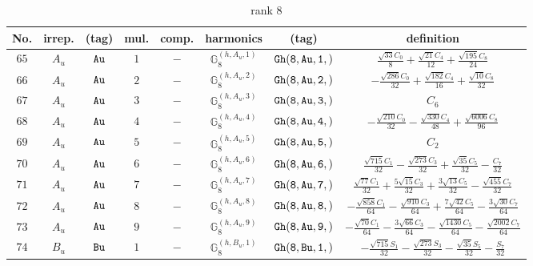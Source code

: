 \documentclass[fleqn,8pt]{jsarticle}
\begin{document}
\begin{table}[ht!]
\begin{center}
\caption{rank 8}
\renewcommand{\arraystretch}{1.3}
\begin{tabular}{cccccccc} \hline \hline
No. & irrep. & (tag) & mul. & comp. & harmonics & (tag) & definition \\ \hline
$ 65 $ & $ A_{u} $ & $ {\tt Au} $ & $ 1 $ & $ - $ & $ \mathbb{G}_{8}^{(h,A_{u},1)} $ & $ {\tt Gh(8,Au,1,)} $ & $ \frac{\sqrt{33} C_{0}}{8} + \frac{\sqrt{21} C_{4}}{12} + \frac{\sqrt{195} C_{8}}{24} $ \\
$ 66 $ & $ A_{u} $ & $ {\tt Au} $ & $ 2 $ & $ - $ & $ \mathbb{G}_{8}^{(h,A_{u},2)} $ & $ {\tt Gh(8,Au,2,)} $ & $ - \frac{\sqrt{286} C_{0}}{32} + \frac{\sqrt{182} C_{4}}{16} + \frac{\sqrt{10} C_{8}}{32} $ \\
$ 67 $ & $ A_{u} $ & $ {\tt Au} $ & $ 3 $ & $ - $ & $ \mathbb{G}_{8}^{(h,A_{u},3)} $ & $ {\tt Gh(8,Au,3,)} $ & $ C_{6} $ \\
$ 68 $ & $ A_{u} $ & $ {\tt Au} $ & $ 4 $ & $ - $ & $ \mathbb{G}_{8}^{(h,A_{u},4)} $ & $ {\tt Gh(8,Au,4,)} $ & $ - \frac{\sqrt{210} C_{0}}{32} - \frac{\sqrt{330} C_{4}}{48} + \frac{\sqrt{6006} C_{8}}{96} $ \\
$ 69 $ & $ A_{u} $ & $ {\tt Au} $ & $ 5 $ & $ - $ & $ \mathbb{G}_{8}^{(h,A_{u},5)} $ & $ {\tt Gh(8,Au,5,)} $ & $ C_{2} $ \\
$ 70 $ & $ A_{u} $ & $ {\tt Au} $ & $ 6 $ & $ - $ & $ \mathbb{G}_{8}^{(h,A_{u},6)} $ & $ {\tt Gh(8,Au,6,)} $ & $ \frac{\sqrt{715} C_{1}}{32} - \frac{\sqrt{273} C_{3}}{32} + \frac{\sqrt{35} C_{5}}{32} - \frac{C_{7}}{32} $ \\
$ 71 $ & $ A_{u} $ & $ {\tt Au} $ & $ 7 $ & $ - $ & $ \mathbb{G}_{8}^{(h,A_{u},7)} $ & $ {\tt Gh(8,Au,7,)} $ & $ \frac{\sqrt{77} C_{1}}{32} + \frac{5 \sqrt{15} C_{3}}{32} + \frac{3 \sqrt{13} C_{5}}{32} - \frac{\sqrt{455} C_{7}}{32} $ \\
$ 72 $ & $ A_{u} $ & $ {\tt Au} $ & $ 8 $ & $ - $ & $ \mathbb{G}_{8}^{(h,A_{u},8)} $ & $ {\tt Gh(8,Au,8,)} $ & $ - \frac{\sqrt{858} C_{1}}{64} - \frac{\sqrt{910} C_{3}}{64} + \frac{7 \sqrt{42} C_{5}}{64} - \frac{3 \sqrt{30} C_{7}}{64} $ \\
$ 73 $ & $ A_{u} $ & $ {\tt Au} $ & $ 9 $ & $ - $ & $ \mathbb{G}_{8}^{(h,A_{u},9)} $ & $ {\tt Gh(8,Au,9,)} $ & $ - \frac{\sqrt{70} C_{1}}{64} - \frac{3 \sqrt{66} C_{3}}{64} - \frac{\sqrt{1430} C_{5}}{64} - \frac{\sqrt{2002} C_{7}}{64} $ \\
$ 74 $ & $ B_{u} $ & $ {\tt Bu} $ & $ 1 $ & $ - $ & $ \mathbb{G}_{8}^{(h,B_{u},1)} $ & $ {\tt Gh(8,Bu,1,)} $ & $ - \frac{\sqrt{715} S_{1}}{32} - \frac{\sqrt{273} S_{3}}{32} - \frac{\sqrt{35} S_{5}}{32} - \frac{S_{7}}{32} $ \\

\end{tabular}
\end{center}
\end{table}
\end{document}
